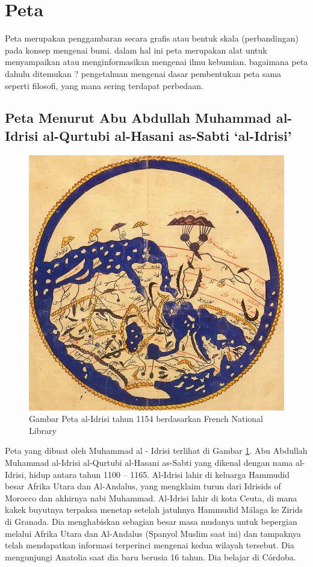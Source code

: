
\section{Peta}
	Peta merupakan penggambaran secara grafis atau bentuk skala (perbandingan) pada konsep mengenai bumi. dalam hal ini peta merupakan alat untuk menyampaikan atau menginformasikan mengenai ilmu kebumian. bagaimana peta dahulu ditemukan ? pengetahuan mengenai dasar pembentukan peta sama seperti filosofi, yang mana sering terdapat perbedaan.

\subsection{Peta Menurut Abu Abdullah Muhammad al-Idrisi al-Qurtubi al-Hasani as-Sabti `al-Idrisi'}
	\begin{figure} [ht]
	\centerline{\includegraphics[width=.5\textwidth]{figures/1.jpg}}
	\caption{Gambar Peta al-Idrisi tahun 1154 berdasarkan French National Library}
	\label{Petaal-Idrisi}
	\end{figure}
	Peta yang dibuat oleh Muhammad al - Idrisi terlihat di Gambar \ref{Petaal-Idrisi}. Abu Abdullah Muhammad al-Idrisi al-Qurtubi al-Hasani as-Sabti yang dikenal dengan nama al-Idrisi, hidup antara tahun 1100 – 1165. Al-Idrisi lahir di keluarga Hammudid besar Afrika Utara dan Al-Andalus, yang mengklaim turun dari Idrisids of Morocco dan akhirnya nabi Muhammad. Al-Idrisi lahir di kota Ceuta, di mana kakek buyutnya terpaksa menetap setelah jatuhnya Hammudid Málaga ke Zirids di Granada. Dia menghabiskan sebagian besar masa mudanya untuk bepergian melalui Afrika Utara dan Al-Andalus (Spanyol Muslim saat ini) dan tampaknya telah mendapatkan informasi terperinci mengenai kedua wilayah tersebut. Dia mengunjungi Anatolia saat dia baru berusia 16 tahun. Dia belajar di Córdoba.
